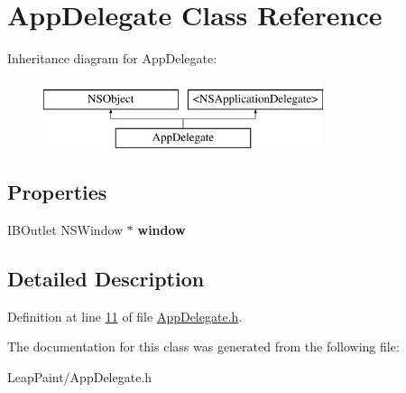 \hypertarget{interface_app_delegate}{\section{App\-Delegate Class Reference}
\label{dd/d52/interface_app_delegate}
}
Inheritance diagram for App\-Delegate\-:\begin{figure}[H]
\begin{center}
\leavevmode
\includegraphics[height=2.000000cm]{dd/d52/interface_app_delegate}
\end{center}
\end{figure}
\subsection*{Properties}
\begin{DoxyCompactItemize}
\item 
\hypertarget{interface_app_delegate_acdf10c46711b4d6a8d95def15620afb6}{I\-B\-Outlet N\-S\-Window $\ast$ {\bfseries window}}\label{dd/d52/interface_app_delegate_acdf10c46711b4d6a8d95def15620afb6}

\end{DoxyCompactItemize}


\subsection{Detailed Description}


Definition at line \hyperlink{_app_delegate_8h_source_l00011}{11} of file \hyperlink{_app_delegate_8h_source}{App\-Delegate.\-h}.



The documentation for this class was generated from the following file\-:\begin{DoxyCompactItemize}
\item 
Leap\-Paint/App\-Delegate.\-h\end{DoxyCompactItemize}
